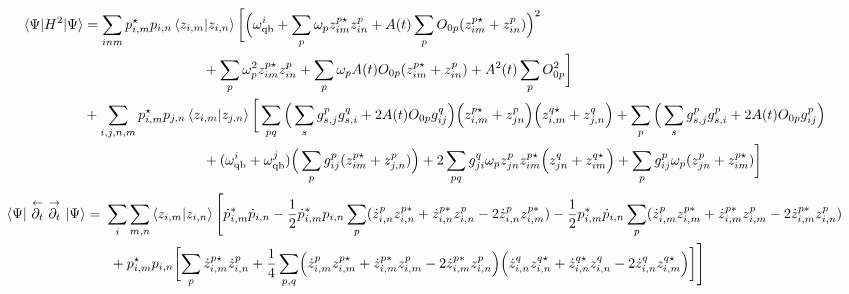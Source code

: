\documentclass[prb]{revtex4}
\begin{document}
\begin{align*}						
\braket{\Psi |  H^2 | \Psi}  & =\sum_{inm} p_{i,m}^\star p_{i,n} \braket{ z_{i,m} | z_{i,n} } \bigg[\Bigl( \omega_{\rm qb}^i +\sum_p \omega_p z_{im}^{p\star} z_{in}^p + A(t)\sum_p O_{0p}(z_{im}^{p\star}+z_{in}^p)\Bigr)^2 \notag \\
& \hspace{3cm}+ \sum_p \omega_p^2 z_{im}^{p\star} z_{in}^p + \sum_p\omega_p A(t)O_{0p}(z_{im}^{p\star}+z_{in}^p) +A^2(t)\sum_p O_{0p}^2  \bigg] \notag \\
& +\sum_{i,j,n,m}p_{i,m}^\star p_{j,n}\braket{z_{i,m}|z_{j,n}} \bigg[ \sum_{pq} \Big(\sum_s g_{s,j}^p g_{s,i}^q+ 2A(t) O_{0p} g_{ij}^q  \Big)  \Big( z_{i,m}^{p\star} + z_{jn}^p\Big) \Big( z_{i,m}^{q\star} + z_{j,n}^{q}  \Big) + \sum_p \Big(\sum_s g_{s,j}^p g_{s,i}^p +  2A(t)O_{0p}g_{ij}^p\Big)  \notag \\
& \hspace{3cm}+( \omega_{\rm qb}^i+ \omega_{\rm qb}^j ) \Big(  \sum_p g_{ij}^p ( z_{im}^{p\star} + z_{j,n}^p )  \Big) + 2\sum_{pq} g_{ji}^q \omega_p  z_{jn}^p z_{im}^{p\star}\Big( z_{jn}^q+z_{im}^{q\star}\Big)    + \sum_p g_{ij}^p  \omega_p (z_{jn}^p + z_{im}^{p\star} ) \biggr] 
\end{align*}
%					 
\begin{align*}
	  \braket{\Psi |\  \overset{\leftarrow}{\partial_t}\ \overset{\rightarrow}{\partial_t}\ | \Psi} =\ &\sum_i \sum_{m,n} \braket{z_{i,m} | z_{i,n}} \Biggl[  \dot p_{i,m}^{*}\dot p_{i,n} - \frac{1}{2} \dot p_{i,m}^{*}p_{i,n}  \sum_p (  \dot z_{i,n}^{p} z^{p*}_{i,n} +  \dot z_{i,n}^{p*} z^p_{i,n} - 2 \dot z_{i,n}^{p} z^{p*}_{i,m} ) - \frac{1}{2} p_{i,m}^{*}\dot p_{i,n} \sum_p (  \dot z_{i,m}^{p} z^{p*}_{i,m} +  \dot z_{i,m}^{p*} z^p_{i,m} - 2 \dot z_{i,m}^{p*} z^{p}_{i,n}) \\
						&\ + p_{i,m}^\star p_{i,n} \biggl[ \sum_p  \dot z_{i,m}^{p\star} \dot z_{i,n}^p + \frac{1}{4}\sum_{p,q} \Bigl( \dot z_{i,m}^{p} z^{p\star}_{i,m}+\dot z_{i,m}^{p*} z^p_{i,m} - 2\dot z_{i,m}^{p*} z^{p}_{i,n}\Bigr) \Bigl(     \dot z_{i,n}^{q} z^{q\star}_{i,n} + \dot z_{i,n}^{q\star} z^{q}_{i,n} - 2  \dot z_{i,n}^{q} z^{q\star}_{i,m} \Bigr) \biggr] \Biggl] 
\end{align*}
%		
\end{document}
